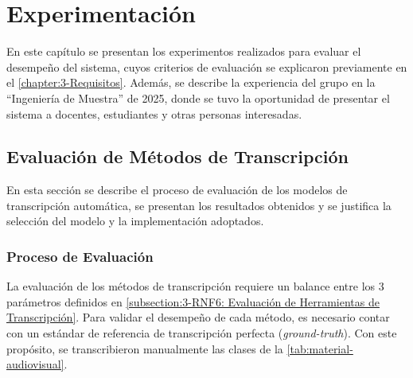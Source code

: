 
\chapter{Experimentación}
\label{chapter:6-Experimentación}

En este capítulo se presentan los experimentos realizados para evaluar el desempeño del sistema, cuyos criterios de evaluación se explicaron previamente en el \autoref{chapter:3-Requisitos}. Además, se describe la experiencia del grupo en la ``Ingeniería de Muestra'' de 2025, donde se tuvo la oportunidad de presentar el sistema a docentes, estudiantes y otras personas interesadas.

\section{Evaluación de Métodos de Transcripción}
\label{section:6-Evaluación de Métodos de Transcripción}
En esta sección se describe el proceso de evaluación de los modelos de transcripción automática, se presentan los resultados obtenidos y se justifica la selección del modelo y la implementación adoptados.
\subsection{Proceso de Evaluación}

La evaluación de los métodos de transcripción requiere un balance entre los 3 parámetros definidos en \autoref{subsection:3-RNF6: Evaluación de Herramientas de Transcripción}. Para validar el desempeño de cada método, es necesario contar con un estándar de referencia de transcripción perfecta (\textit{ground-truth}). Con este propósito, se transcribieron manualmente las clases de la \autoref{tab:material-audiovisual}.

